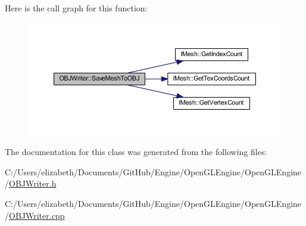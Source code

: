 Here is the call graph for this function\+:
\nopagebreak
\begin{figure}[H]
\begin{center}
\leavevmode
\includegraphics[width=350pt]{class_o_b_j_writer_a99cb9b1c28fa4c59c8087a9c1c6899e3_cgraph}
\end{center}
\end{figure}




The documentation for this class was generated from the following files\+:\begin{DoxyCompactItemize}
\item 
C\+:/\+Users/elizabeth/\+Documents/\+Git\+Hub/\+Engine/\+Open\+G\+L\+Engine/\+Open\+G\+L\+Engine/\hyperlink{_o_b_j_writer_8h}{O\+B\+J\+Writer.\+h}\item 
C\+:/\+Users/elizabeth/\+Documents/\+Git\+Hub/\+Engine/\+Open\+G\+L\+Engine/\+Open\+G\+L\+Engine/\hyperlink{_o_b_j_writer_8cpp}{O\+B\+J\+Writer.\+cpp}\end{DoxyCompactItemize}
